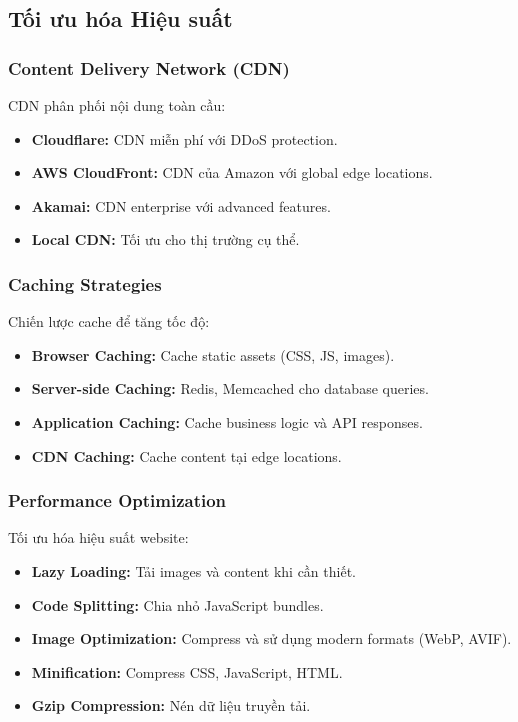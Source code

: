 \documentclass[a4paper,12pt]{report}
\begin{document}
\subsection{Tối ưu hóa Hiệu suất}

\subsubsection{Content Delivery Network (CDN)}
CDN phân phối nội dung toàn cầu:
\begin{itemize}
    \item \textbf{Cloudflare:} CDN miễn phí với DDoS protection.
    \item \textbf{AWS CloudFront:} CDN của Amazon với global edge locations.
    \item \textbf{Akamai:} CDN enterprise với advanced features.
    \item \textbf{Local CDN:} Tối ưu cho thị trường cụ thể.
\end{itemize}

\subsubsection{Caching Strategies}
Chiến lược cache để tăng tốc độ:
\begin{itemize}
    \item \textbf{Browser Caching:} Cache static assets (CSS, JS, images).
    \item \textbf{Server-side Caching:} Redis, Memcached cho database queries.
    \item \textbf{Application Caching:} Cache business logic và API responses.
    \item \textbf{CDN Caching:} Cache content tại edge locations.
\end{itemize}

\subsubsection{Performance Optimization}
Tối ưu hóa hiệu suất website:
\begin{itemize}
    \item \textbf{Lazy Loading:} Tải images và content khi cần thiết.
    \item \textbf{Code Splitting:} Chia nhỏ JavaScript bundles.
    \item \textbf{Image Optimization:} Compress và sử dụng modern formats (WebP, AVIF).
    \item \textbf{Minification:} Compress CSS, JavaScript, HTML.
    \item \textbf{Gzip Compression:} Nén dữ liệu truyền tải.
\end{itemize}
\end{document}
